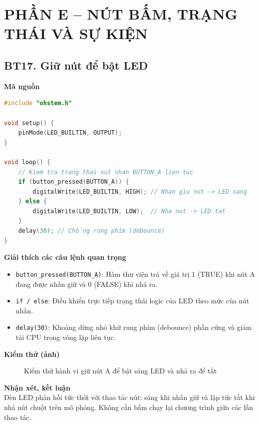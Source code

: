 \section*{PHẦN E – NÚT BẤM, TRẠNG THÁI VÀ SỰ KIỆN}

\subsection*{BT17. Giữ nút để bật LED}

\noindent\textbf{Mã nguồn}\\
\begin{lstlisting}[language=C]
#include "ohstem.h"

void setup() {
    pinMode(LED_BUILTIN, OUTPUT);
}

void loop() {
    // Kiem tra trang thai nut nhan BUTTON_A lien tuc
    if (button_pressed(BUTTON_A)) {
        digitalWrite(LED_BUILTIN, HIGH); // Nhan giu nut -> LED sang
    } else {
        digitalWrite(LED_BUILTIN, LOW);  // Nha nut -> LED tat
    }
    delay(30); // Chống rung phím (debounce)
}
\end{lstlisting}

\noindent\textbf{Giải thích các câu lệnh quan trọng}\\
\begin{itemize}
    \item \texttt{button\_pressed(BUTTON\_A)}: Hàm thư viện trả về giá trị 1 (TRUE) khi nút A đang được nhấn giữ và 0 (FALSE) khi nhả ra.
    \item \texttt{if / else}: Điều khiển trực tiếp trạng thái logic của LED theo mức của nút nhấn.
    \item \texttt{delay(30)}: Khoảng dừng nhỏ khử rung phím (debounce) phần cứng và giảm tải CPU trong vòng lặp liên tục.
\end{itemize}

\noindent\textbf{Kiểm thử (ảnh)}\\
\begin{figure}[H]
    \centering
    \caption{Kiểm thử hành vi giữ nút A để bật sáng LED và nhả ra để tắt}
    \label{fig:bt17}
\end{figure}

\noindent\textbf{Nhận xét, kết luận}\\
Đèn LED phản hồi tức thời với thao tác nút: sáng khi nhấn giữ và lập tức tắt khi nhả nút chuột trên mô phỏng. Không cần bấm chạy lại chương trình giữa các lần thao tác.


